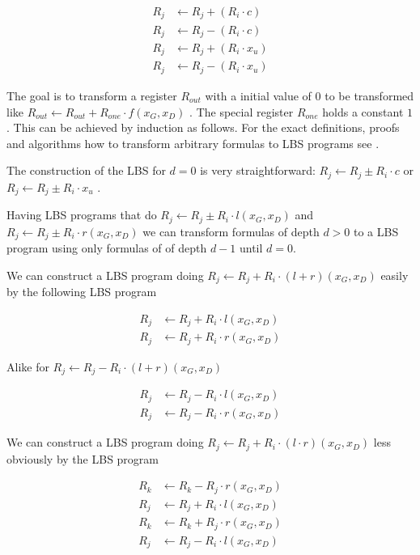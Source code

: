 \begin{align*}
R_j & \leftarrow R_j + (R_i \cdot c) \\
R_j & \leftarrow R_j - (R_i \cdot c) \\
R_j & \leftarrow R_j + (R_i \cdot x_u) \\
R_j & \leftarrow R_j - (R_i \cdot x_u)
\end{align*}



The goal is to transform a register $R_{out}$ with a initial value of $0$ to be
transformed like $R_{out} \leftarrow R_{out} + R_{one} \cdot f(x_G,x_D)$ . The
special register $R_{one}$ holds a constant $1$. This can be achieved by
induction as follows.  For the exact definitions, proofs and algorithms how to
transform arbitrary formulas to LBS programs see \cite{cleve91}.



The construction of the LBS for $d = 0$ is very straightforward:
$R_j \leftarrow R_j \pm R_i \cdot c$ or $R_j \leftarrow R_j \pm R_i \cdot x_u$ .



Having LBS programs that do $R_j \leftarrow R_j \pm R_i \cdot l(x_G, x_D)$  and
$R_j \leftarrow R_j \pm R_i \cdot r(x_G, x_D)$ we can
transform formulas of depth $d > 0$ to a LBS program using only formulas of
of depth $d - 1$ until $d = 0$.

 We can construct a LBS program doing $R_j \leftarrow
R_j + R_i \cdot (l + r)(x_G, x_D)$ easily by the following LBS program

\begin{align*}
R_j & \leftarrow R_j + R_i \cdot l(x_G, x_D) \\
R_j & \leftarrow R_j + R_i \cdot r(x_G, x_D)
\end{align*}

Alike for $R_j \leftarrow R_j - R_i \cdot (l + r)(x_G, x_D)$

\begin{align*}
R_j & \leftarrow R_j - R_i \cdot l(x_G, x_D) \\
R_j & \leftarrow R_j - R_i \cdot r(x_G, x_D)
\end{align*}


 We can construct a LBS program doing $R_j
\leftarrow R_j + R_i \cdot (l \cdot r)(x_G, x_D)$ less obviously by the LBS
program

\begin{align*}
R_k & \leftarrow R_k - R_j \cdot r(x_G, x_D) \\
R_j & \leftarrow R_j + R_i \cdot l(x_G, x_D) \\
R_k & \leftarrow R_k + R_j \cdot r(x_G, x_D) \\
R_j & \leftarrow R_j - R_i \cdot l(x_G, x_D)
\end{align*}

